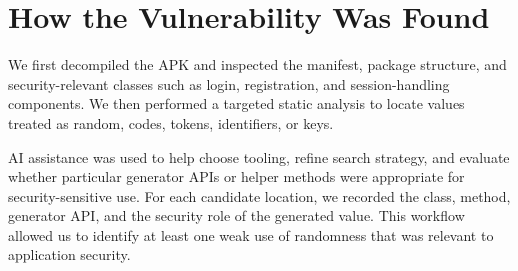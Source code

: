 \section{How the Vulnerability Was Found}

We first decompiled the APK and inspected the manifest, package structure, and
security-relevant classes such as login, registration, and session-handling
components. We then performed a targeted static analysis to locate values
treated as random, codes, tokens, identifiers, or keys.

AI assistance was used to help choose tooling, refine search strategy, and
evaluate whether particular generator APIs or helper methods were appropriate
for security-sensitive use. For each candidate location, we recorded the class,
method, generator API, and the security role of the generated value. This
workflow allowed us to identify at least one weak use of randomness that was
relevant to application security.
